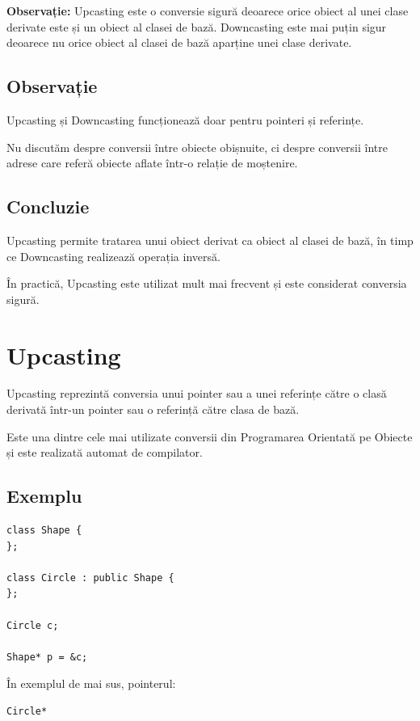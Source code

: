 \documentclass[12pt,a4paper]{article}
\begin{document}
\textbf{Observație:} Upcasting este o conversie sigură deoarece orice obiect al unei clase derivate este și un obiect al clasei de bază. Downcasting este mai puțin sigur deoarece nu orice obiect al clasei de bază aparține unei clase derivate.


\subsection{Observație}

Upcasting și Downcasting funcționează doar pentru pointeri și referințe.

Nu discutăm despre conversii între obiecte obișnuite, ci despre conversii între adrese care referă obiecte aflate într-o relație de moștenire.

\subsection{Concluzie}

Upcasting permite tratarea unui obiect derivat ca obiect al clasei de bază, în timp ce Downcasting realizează operația inversă.

În practică, Upcasting este utilizat mult mai frecvent și este considerat conversia sigură.




\section{Upcasting}

Upcasting reprezintă conversia unui pointer sau a unei referințe către o clasă derivată într-un pointer sau o referință către clasa de bază.

Este una dintre cele mai utilizate conversii din Programarea Orientată pe Obiecte și este realizată automat de compilator.

\subsection{Exemplu}

\begin{verbatim}
class Shape {
};

class Circle : public Shape {
};

Circle c;

Shape* p = &c;
\end{verbatim}

În exemplul de mai sus, pointerul:

\begin{verbatim}
Circle*
\end{verbatim}
\end{document}
